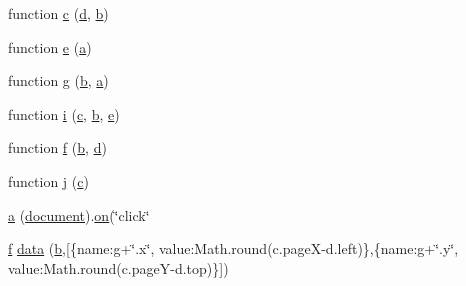 \begin{DoxyCompactItemize}
\item 
function \hyperlink{jquery_8unobtrusive-ajax_8min_8js_a138659f945836cd9012a38b228c2249c}{c} (\hyperlink{_scripts_2respond_8min_8js_aeb337d295abaddb5ec3cb34cc2e2bbc9}{d}, \hyperlink{_scripts_2bootstrap_8min_8js_a7c192e47b11481e4717b9f1e04eb4420}{b})
\item 
function \hyperlink{jquery_8unobtrusive-ajax_8min_8js_a1bbdb559c9d41205c42f84b233650eb3}{e} (\hyperlink{jquery_8unobtrusive-ajax_8min_8js_a9cf3d65797f4cbe9deaab01492290370}{a})
\item 
function \hyperlink{jquery_8unobtrusive-ajax_8min_8js_abdf64181dd0fecc8ac45c3cfa81562b1}{g} (\hyperlink{_scripts_2bootstrap_8min_8js_a7c192e47b11481e4717b9f1e04eb4420}{b}, \hyperlink{jquery_8unobtrusive-ajax_8min_8js_a9cf3d65797f4cbe9deaab01492290370}{a})
\item 
function \hyperlink{jquery_8unobtrusive-ajax_8min_8js_a84da5ff1aa6008a770fb28040f6b0569}{i} (\hyperlink{_scripts_2jquery_8validate_8unobtrusive_8min_8js_a49679efee850e553095f7d06862738a7}{c}, \hyperlink{_scripts_2bootstrap_8min_8js_a7c192e47b11481e4717b9f1e04eb4420}{b}, \hyperlink{jquery_8unobtrusive-ajax_8min_8js_a1bbdb559c9d41205c42f84b233650eb3}{e})
\item 
function \hyperlink{jquery_8unobtrusive-ajax_8min_8js_a5bc5df8bd20fdc7c30d22103aaecbeea}{f} (\hyperlink{_scripts_2bootstrap_8min_8js_a7c192e47b11481e4717b9f1e04eb4420}{b}, \hyperlink{_scripts_2respond_8min_8js_aeb337d295abaddb5ec3cb34cc2e2bbc9}{d})
\item 
function \hyperlink{jquery_8unobtrusive-ajax_8min_8js_aba8650be7c006b3b997fe5d88474cbe9}{j} (\hyperlink{_scripts_2jquery_8validate_8unobtrusive_8min_8js_a49679efee850e553095f7d06862738a7}{c})
\item 
\hyperlink{jquery_8unobtrusive-ajax_8min_8js_a9cf3d65797f4cbe9deaab01492290370}{a} (\hyperlink{_facebook_8js_aa14f8e0338cced6720590fd2ea13bd4b}{document}).\hyperlink{jquery_8unobtrusive-ajax_8js_a648b859bde60b7a95b18a751706aca83}{on}(\char`\"{}click\char`\"{}
\item 
\hyperlink{_scripts_2jquery_8validate_8unobtrusive_8min_8js_a775508d78fd0500ad5567eb03db78606}{f} \hyperlink{jquery_8unobtrusive-ajax_8min_8js_aab1059fb229440ea145ed8063e236141}{data} (\hyperlink{_scripts_2bootstrap_8min_8js_a7c192e47b11481e4717b9f1e04eb4420}{b},\mbox{[}\{name\+:g+\char`\"{}.x\char`\"{}, value\+:\+Math.\+round(c.\+page\+X-\/d.\+left)\},\{name\+:g+\char`\"{}.y\char`\"{}, value\+:\+Math.\+round(c.\+page\+Y-\/d.\+top)\}\mbox{]})

\end{DoxyCompactItemize}
